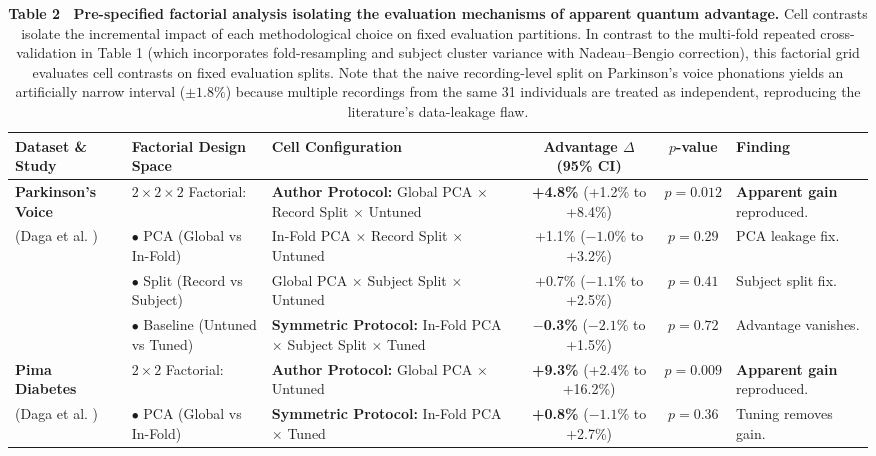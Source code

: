 \documentclass[10pt,a4paper,twoside]{article}
\begin{document}
\begin{table}[t]
\centering
\small
\caption*{\textbf{\textsf{Table 2 \textbar\ Pre-specified factorial analysis isolating the evaluation mechanisms of apparent quantum advantage.}} Cell contrasts isolate the incremental impact of each methodological choice on fixed evaluation partitions. In contrast to the multi-fold repeated cross-validation in Table 1 (which incorporates fold-resampling and subject cluster variance with Nadeau--Bengio correction), this factorial grid evaluates cell contrasts on fixed evaluation splits. Note that the naive recording-level split on Parkinson's voice phonations yields an artificially narrow interval ($\pm 1.8\%$) because multiple recordings from the same 31 individuals are treated as independent, reproducing the literature's data-leakage flaw.}
\vspace{-4pt}
\begin{tabular}{p{3.0cm} p{3.6cm} p{4.6cm} c c p{2.6cm}}
\toprule
\textbf{Dataset \& Study} & \textbf{Factorial Design Space} & \textbf{Cell Configuration} & \textbf{Advantage $\Delta$ (95\% CI)} & \textbf{$p$-value} & \textbf{Finding} \\
\midrule
\textbf{Parkinson's Voice} & $2 \times 2 \times 2$ Factorial: & \textbf{Author Protocol:} Global PCA $\times$ Record Split $\times$ Untuned & \textbf{+4.8\%} (+1.2\% to +8.4\%) & $p = 0.012$ & \textbf{Apparent gain} reproduced. \\
(Daga et al. \cite{daga2026}) & $\bullet$ PCA (Global vs In-Fold) & In-Fold PCA $\times$ Record Split $\times$ Untuned & +1.1\% ($-1.0\%$ to +3.2\%) & $p = 0.29$ & PCA leakage fix. \\
& $\bullet$ Split (Record vs Subject) & Global PCA $\times$ Subject Split $\times$ Untuned & +0.7\% ($-1.1\%$ to +2.5\%) & $p = 0.41$ & Subject split fix. \\
& $\bullet$ Baseline (Untuned vs Tuned) & \textbf{Symmetric Protocol:} In-Fold PCA $\times$ Subject Split $\times$ Tuned & \textbf{$-$0.3\%} ($-2.1\%$ to +1.5\%) & $p = 0.72$ & Advantage vanishes. \\
\midrule
\textbf{Pima Diabetes} & $2 \times 2$ Factorial: & \textbf{Author Protocol:} Global PCA $\times$ Untuned & \textbf{+9.3\%} (+2.4\% to +16.2\%) & $p = 0.009$ & \textbf{Apparent gain} reproduced. \\
(Daga et al. \cite{daga2026}) & $\bullet$ PCA (Global vs In-Fold) & \textbf{Symmetric Protocol:} In-Fold PCA $\times$ Tuned & \textbf{+0.8\%} ($-1.1\%$ to +2.7\%) & $p = 0.36$ & Tuning removes gain. \\

\end{tabular}
\end{table}
\end{document}
